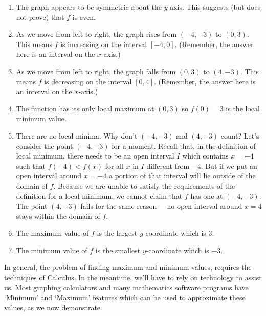 {\begin{enumerate}


\item  The graph appears to be symmetric about the $y$-axis.  This suggests (but does not prove) that $f$ is even.

\item  As we move from left to right, the graph rises from $(-4,-3)$ to $(0,3)$.  This means $f$ is increasing on the interval $[-4,0]$.  (Remember, the answer here is an interval on the $x$-axis.)

\item  As we move from left to right, the graph falls from $(0,3)$ to $(4,-3)$.  This means $f$ is decreasing on the interval $[0,4]$.  (Remember, the answer here is an interval on the $x$-axis.)

\item  The function has its only local maximum at $(0,3)$ so $f(0) = 3$ is the local minimum value.

\item  There are no local minima.  Why don't $(-4, -3)$ and $(4, -3)$ count?  Let's consider the point $(-4, -3)$ for a moment.  Recall that, in the definition of local minimum, there needs to be an open interval $I$ which contains $x = -4$ such that $f(-4) < f(x)$ for all $x$ in $I$ different from $-4$.  But if we put an open interval around $x= -4$ a portion of that interval will lie outside of the domain of $f$.  Because we are unable to satisfy the requirements of the definition for a local minimum, we cannot claim that $f$ has one at $(-4, -3)$.  The point $(4, -3)$ fails for the same reason $-$ no open interval around $x = 4$ stays within the domain of $f$.

\item  The maximum value of $f$ is the largest $y$-coordinate which is $3$.

\item  The minimum value of $f$ is the smallest $y$-coordinate which is $-3$.
\end{enumerate}}

\medskip

In general, the problem of finding maximum and minimum values, requires the techniques of Calculus.  In the meantime, we'll have to rely on technology to assist us.  Most graphing calculators and many mathematics software programs have `Minimum' and `Maximum' features which can be used to approximate these values, as we now demonstrate.


